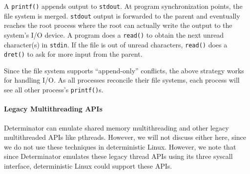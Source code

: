 A {\tt printf()} appends output to {\tt stdout}. At program synchronization
points, the file system is merged. {\tt stdout} output is forwarded
to the parent and eventually reaches the root process where the root can
actually write the output to the system's I/O device.
A program does a {\tt read()} to obtain the next unread character(s) in
{\tt stdin}. If the file is out of unread characters, {\tt read()} does a
{\tt dret()} to ask for more input from the parent.

Since the file system supports ``append-only'' conflicts, the above strategy
works for handling I/O. As all processes reconcile their file systems, each
process will see all other process's {\tt printf()}s.

\paragraph{Legacy Multithreading APIs}
Determinator can emulate shared memory multithreading and other legacy
multithreaded APIs like pthreads. However, we will not discuss either here,
since we do not use these techniques in deterministic Linux. However, we note
that since Determinator emulates these legacy thread APIs using its three
syscall interface, deterministic Linux could support these APIs.

\endinput

